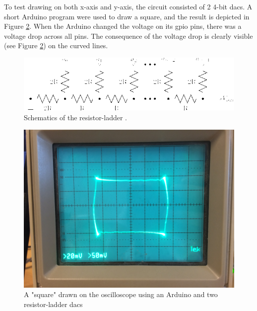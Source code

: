 To test drawing on both x-axis and y-axis, the circuit consisted of 2 4-bit \gls{dac}s.
A short Arduino program were used to draw a square, and the result is depicted in Figure \ref{fig:osc_poc}.
When the Arduino changed the voltage on its \gls{gpio} pins, there was a voltage drop across all pins.
The consequence of the voltage drop is clearly visible (see Figure \ref{fig:osc_poc}) on the curved lines.


\begin{figure}[h]
\includegraphics[width=\columnwidth]{images/r2r-ladder}
\centering
\caption{Schematics of the resistor-ladder \cite{r2r-ladder-schematics}.}
\label{fig:r2r-ladder}
\end{figure}

\begin{figure}[h]
\includegraphics[width=\columnwidth]{images/osc_square_close}
\centering
\caption{A "square" drawn on the oscilloscope using an Arduino and two resistor-ladder \gls{dac}s}
\label{fig:osc_poc}
\end{figure}
